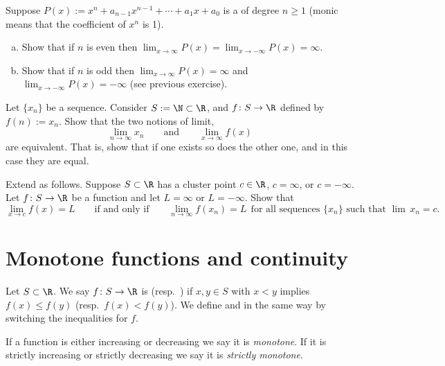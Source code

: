 \documentclass[12pt]{book}
\begin{document}
\begin{exercise}
Suppose $P(x) := x^n + a_{n-1} x^{n-1} + \cdots + a_1 x + a_0$ is a \emph{}
of degree $n \geq 1$ (monic means that the coefficient of $x^n$ is 1). 
\begin{enumerate}[a)]
 \item Show that if $n$ is even then $\lim_{x\to\infty} P(x) = 
\lim_{x\to-\infty} P(x) = \infty$.
 \item Show that if $n$ is odd then
$\lim_{x\to\infty} P(x) = \infty$ and
$\lim_{x\to-\infty} P(x) = -\infty$ (see previous exercise).
\end{enumerate}
\end{exercise}

\begin{exercise}
Let $\{ x_n \}$ be a sequence.
Consider $S := \N \subset \R$, and
$f \colon S \to \R$ defined by $f(n) := x_n$.
Show that
the two notions of limit,
\begin{equation*}
\lim_{n\to\infty} x_n \qquad \text{and} \qquad
\lim_{x\to\infty} f(x) 
\end{equation*}
are equivalent.
That is, show that if one exists so does
the other one, and in this case they are equal.
\end{exercise}

\begin{exercise}
Extend  as follows.
Suppose $S \subset \R$ has a cluster point $c \in \R$, $c = \infty$,
or $c = -\infty$.
Let $f \colon S \to \R$ be a function and let
$L = \infty$ or $L = -\infty$.
Show that
\begin{equation*}
\lim_{x\to c} f(x) = L \qquad \text{if and only if} \qquad
\lim_{n\to\infty} f(x_n) = L ~~\text{for all sequences $\{ x_n \}$ such that $\lim\, x_n =
c$} .
\end{equation*}
\end{exercise}


\sectionnewpage
\section{Monotone functions and continuity}
\label{sec:monotonefunc}


\begin{defn}
Let $S \subset \R$.
We say $f \colon S \to \R$ is \emph{}
(resp.\  \emph{}) if $x,y \in S$ with
$x < y$ implies $f(x) \leq f(y)$ (resp.\ $f(x) < f(y)$).
We define
\emph{} and
\emph{} in the same way by switching the
inequalities for $f$.

If a function is either increasing or decreasing we say it is
\emph{monotone}.
If it is
strictly increasing or strictly decreasing we say it is
\emph{strictly monotone}.
\end{defn}
\end{document}
